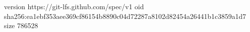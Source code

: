 version https://git-lfs.github.com/spec/v1
oid sha256:ea1ebf353aee369cf86154b8890c04d72287a8102d82454a26441b1c3859a1d7
size 786528
